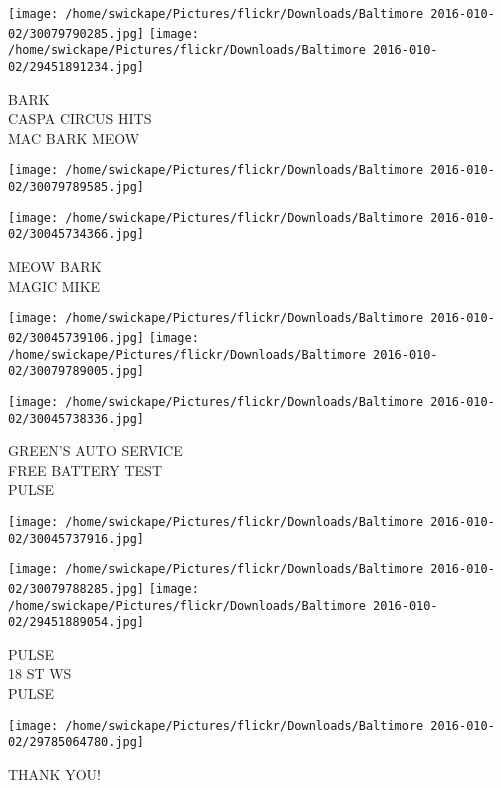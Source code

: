 \documentclass[10pt,letterpaper]{article}
\begin{document}
\vspace{0.25in}
\texttt{[image: /home/swickape/Pictures/flickr/Downloads/Baltimore 2016-010-02/30079790285.jpg]}
\texttt{[image: /home/swickape/Pictures/flickr/Downloads/Baltimore 2016-010-02/29451891234.jpg]}

BARK\\
CASPA CIRCUS HITS\\
MAC BARK MEOW
\pagebreak

\texttt{[image: /home/swickape/Pictures/flickr/Downloads/Baltimore 2016-010-02/30079789585.jpg]}

\vspace{0.25in}
\texttt{[image: /home/swickape/Pictures/flickr/Downloads/Baltimore 2016-010-02/30045734366.jpg]}

MEOW BARK\\
MAGIC MIKE
\pagebreak

\texttt{[image: /home/swickape/Pictures/flickr/Downloads/Baltimore 2016-010-02/30045739106.jpg]}
\texttt{[image: /home/swickape/Pictures/flickr/Downloads/Baltimore 2016-010-02/30079789005.jpg]}

\texttt{[image: /home/swickape/Pictures/flickr/Downloads/Baltimore 2016-010-02/30045738336.jpg]}

GREEN'S AUTO SERVICE\\
FREE BATTERY TEST\\
PULSE
\pagebreak

\texttt{[image: /home/swickape/Pictures/flickr/Downloads/Baltimore 2016-010-02/30045737916.jpg]}

\vspace{0.25in}
\texttt{[image: /home/swickape/Pictures/flickr/Downloads/Baltimore 2016-010-02/30079788285.jpg]}
\texttt{[image: /home/swickape/Pictures/flickr/Downloads/Baltimore 2016-010-02/29451889054.jpg]}

PULSE\\
18 ST WS\\
PULSE
\pagebreak

\texttt{[image: /home/swickape/Pictures/flickr/Downloads/Baltimore 2016-010-02/29785064780.jpg]}

THANK YOU!
\pagebreak
\end{document}
